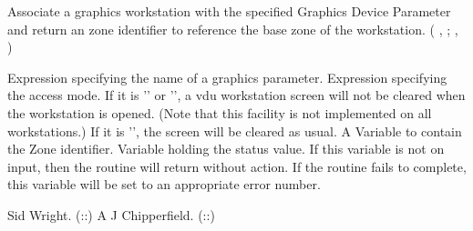 \begin{manroutinedescription}
     Associate a graphics workstation with the specified Graphics
     Device Parameter and return an {} zone identifier to reference
     the base zone of the workstation.
     {} {} ( {}, {}; {%
}, {})
\begin{manparametertable}

           Expression specifying the name of a graphics parameter.
           Expression specifying the access mode.
           If it is '{}' or '{}', a vdu workstation %
screen
           will not be cleared when the workstation is opened.
           (Note that this facility is not implemented on all
workstations.)
           If it is '{}', the screen will be cleared as usual.
           A Variable to contain the Zone identifier.
           Variable holding the status value.   If this variable
           is not {} on input, then the routine will return
           without action.   If the routine fails to complete,
           this variable will be set to an appropriate error
           number.
\end{manparametertable}
     Sid Wright.  ({}::{})
     A J Chipperfield.  ({}::{})
\end{manroutinedescription}
